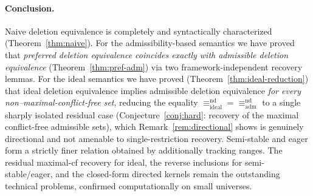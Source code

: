 \documentclass{amsart}
\theoremstyle{remark}
\begin{document}
\paragraph{Conclusion.}  Naive deletion equivalence is completely and
syntactically characterized (Theorem~\ref{thm:naive}).  For the
admissibility-based semantics we have proved that \emph{preferred deletion
equivalence coincides exactly with admissible deletion equivalence}
(Theorem~\ref{thm:pref-adm}) via two framework-independent recovery lemmas.  For
the ideal semantics we have proved (Theorem~\ref{thm:ideal-reduction}) that ideal
deletion equivalence implies admissible deletion equivalence \emph{for every
non--maximal-conflict-free set}, reducing the equality
$\equiv^{\mathrm{nd}}_{\mathrm{ideal}}=\equiv^{\mathrm{nd}}_{\mathrm{adm}}$ to a
single sharply isolated residual case (Conjecture~\ref{conj:hard}: recovery of
the maximal conflict-free admissible sets), which Remark~\ref{rem:directional}
shows is genuinely directional and not amenable to single-restriction recovery.
Semi-stable and eager form a strictly finer relation obtained by additionally
tracking ranges.  The residual maximal-cf recovery for ideal, the reverse
inclusions for semi-stable/eager, and the closed-form directed kernels remain the
outstanding technical problems, confirmed computationally on small universes.
\end{document}
